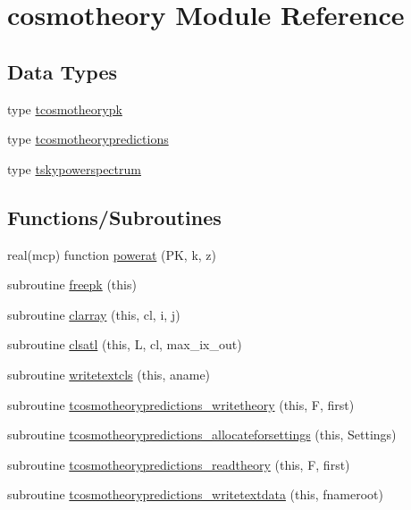 \hypertarget{namespacecosmotheory}{}\section{cosmotheory Module Reference}
\label{namespacecosmotheory}
\subsection*{Data Types}
\begin{DoxyCompactItemize}
\item 
type \mbox{\hyperlink{structcosmotheory_1_1tcosmotheorypk}{tcosmotheorypk}}
\item 
type \mbox{\hyperlink{structcosmotheory_1_1tcosmotheorypredictions}{tcosmotheorypredictions}}
\item 
type \mbox{\hyperlink{structcosmotheory_1_1tskypowerspectrum}{tskypowerspectrum}}
\end{DoxyCompactItemize}
\subsection*{Functions/\+Subroutines}
\begin{DoxyCompactItemize}
\item 
real(mcp) function \mbox{\hyperlink{namespacecosmotheory_a6c9071e7ff33914f7d9957dcf8790938}{powerat}} (PK, k, z)
\item 
subroutine \mbox{\hyperlink{namespacecosmotheory_a9f04a404c1ca817b4a8ff9046f85bea6}{freepk}} (this)
\item 
subroutine \mbox{\hyperlink{namespacecosmotheory_a605ce5a8433255f2dffd34cc83381994}{clarray}} (this, cl, i, j)
\item 
subroutine \mbox{\hyperlink{namespacecosmotheory_a98c26fbec9089b69336f49452bf55c94}{clsatl}} (this, L, cl, max\+\_\+ix\+\_\+out)
\item 
subroutine \mbox{\hyperlink{namespacecosmotheory_aa5b006674819db6a4859e0e709fbd275}{writetextcls}} (this, aname)
\item 
subroutine \mbox{\hyperlink{namespacecosmotheory_a4ff659fbb6df4ea03d45ef993ec6dd32}{tcosmotheorypredictions\+\_\+writetheory}} (this, F, first)
\item 
subroutine \mbox{\hyperlink{namespacecosmotheory_a6d0d95c32ef1d72829beee8c549606d9}{tcosmotheorypredictions\+\_\+allocateforsettings}} (this, Settings)
\item 
subroutine \mbox{\hyperlink{namespacecosmotheory_aef1a661d37d1e130bced884acc9ea1bd}{tcosmotheorypredictions\+\_\+readtheory}} (this, F, first)
\item 
subroutine \mbox{\hyperlink{namespacecosmotheory_a10b74bbd756437c4b81eb4130afae354}{tcosmotheorypredictions\+\_\+writetextdata}} (this, fnameroot)
\end{DoxyCompactItemize}


